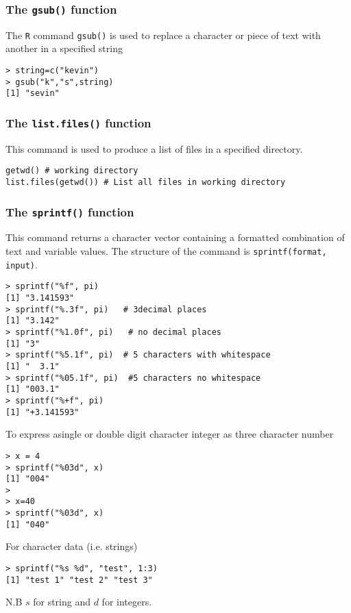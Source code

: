 \documentclass[]{article}
\begin{document}
\subsubsection{The \texttt{gsub()} function}
The \texttt{R} command \texttt{gsub()} is used to replace a character or piece of text with another in a specified string
\begin{verbatim}
> string=c("kevin")
> gsub("k","s",string)
[1] "sevin"
\end{verbatim}
\newpage
\subsubsection{The \texttt{list.files()} function}
This command is used to produce a list of files in a specified directory.
\begin{framed}
\begin{verbatim}
getwd() # working directory
list.files(getwd()) # List all files in working directory
\end{verbatim}
\end{framed}
\subsubsection{The \texttt{sprintf()} function}
This command returns a character vector containing a formatted combination of text and variable values. The structure of the command is \texttt{sprintf(format, input)}.
\begin{verbatim}
> sprintf("%f", pi)     
[1] "3.141593"
> sprintf("%.3f", pi)   # 3decimal places
[1] "3.142"
> sprintf("%1.0f", pi)   # no decimal places
[1] "3"
> sprintf("%5.1f", pi)  # 5 characters with whitespace
[1] "  3.1"  
> sprintf("%05.1f", pi)  #5 characters no whitespace
[1] "003.1"
> sprintf("%+f", pi)
[1] "+3.141593"
\end{verbatim}

To express asingle or double digit character integer as three character number
\begin{verbatim}
> x = 4
> sprintf("%03d", x)
[1] "004"
> 
> x=40
> sprintf("%03d", x)
[1] "040"
\end{verbatim}

For character data (i.e. strings) 
\begin{verbatim}
> sprintf("%s %d", "test", 1:3)
[1] "test 1" "test 2" "test 3"
\end{verbatim}
N.B $s$ for string and $d$ for integers.
\newpage
\end{document}
